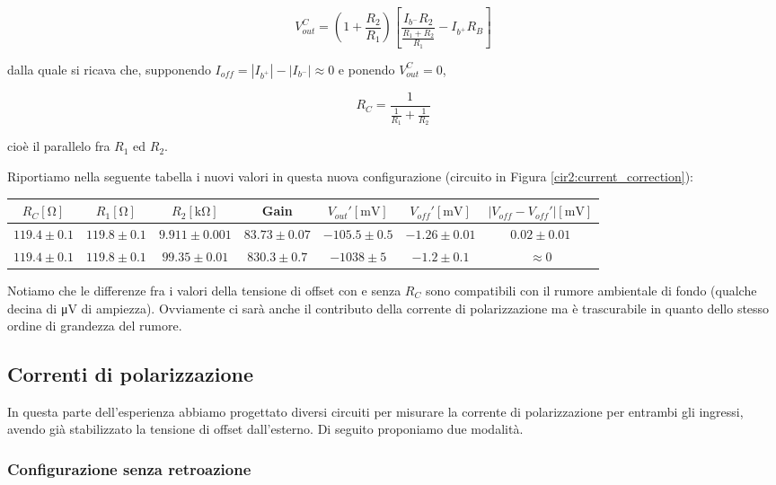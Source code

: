 \begin{equation}
V_{out}^{C} = \left( 1+\frac{R_2}{R_1} \right)\left[ \frac{I_{b^-}R_2}{\frac{R_1+R_2}{R_1}} - I_{b^+} R_B\right]
\label{eq2:Vout_currents}
\end{equation}

dalla quale si ricava che, supponendo $I_{off} = |I_{b^+}|-|I_{b^-}| \approx 0$ e ponendo $V_{out}^{C}=0$,

$$R_C=\frac{1}{\frac{1}{R_1} + \frac{1}{R_2}} $$

cioè il parallelo fra $R_1$ ed $R_2$.

Riportiamo nella seguente tabella i nuovi valori in questa nuova configurazione (circuito in Figura \ref{cir2:current_correction}):

\begin{center}
\begin{tabular}{c|c|c|c|c|c|c}
$R_C [\si{\ohm}]$& $R_1[\si{\ohm}]$ & $R_2[\si{\kilo\ohm}]$ & Gain & $V_{out}' [\si{\milli\volt}]$ & $V_{off}' [\si{\milli\volt}]$ & $|V_{off}-V_{off}'|[\si{\milli\volt}]$ \\ 
\hline 
$119.4\pm0.1$ & $119.8\pm0.1$ & $9.911\pm0.001$  & $83.73 \pm 0.07$ & $-105.5 \pm 0.5$ & $-1.26 \pm0.01$ & $0.02\pm0.01$ \\
\hline
$119.4\pm0.1$ & $119.8\pm0.1$ & $99.35\pm0.01$  & $830.3\pm0.7$ &$ -1038 \pm 5$ & $-1.2 \pm 0.1$ & $\approx 0$\\
\end{tabular}
\end{center}

Notiamo che le differenze fra i valori della tensione di offset con e senza $R_C$ sono compatibili con il rumore ambientale di fondo (qualche decina di \si{\micro\volt} di ampiezza). Ovviamente ci sarà anche il contributo della corrente di polarizzazione ma è trascurabile in quanto dello stesso ordine di grandezza del rumore.

\subsection{Correnti di polarizzazione}

In questa parte dell'esperienza abbiamo progettato diversi circuiti per misurare la corrente di polarizzazione per entrambi gli ingressi, avendo già stabilizzato la tensione di offset dall'esterno. Di seguito proponiamo due modalità.

\subsubsection{Configurazione senza retroazione}


